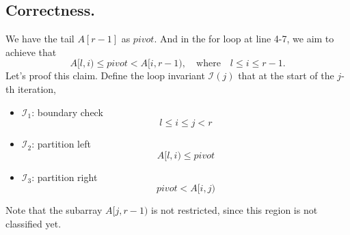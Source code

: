 \documentclass[12pt]{article}
\begin{document}
\subsection*{Correctness.}

We have the tail \(A[r - 1]\) as \(pivot\). And in the for loop at line 4-7, we aim to achieve that
\[
    A[l, i) \leq pivot < A[i, r-1), \quad \text{where} \quad l \leq i \leq r-1.
\]
Let's proof this claim. Define the loop invariant \(\mathcal{I}(j)\) that at the start of the \(j\)-th iteration,
\begin{itemize}
    \item \(\mathcal{I}_1\): boundary check
    \[
        l \leq i \leq j < r
    \]
    \item \(\mathcal{I}_2\): partition left
    \[
        A[l, i) \leq pivot
    \]
    \item \(\mathcal{I}_3\): partition right
    \[
        pivot < A[i, j)
    \]
\end{itemize}

Note that the subarray \(A[j, r-1)\) is not restricted, since this region is not classified yet.
\end{document}
